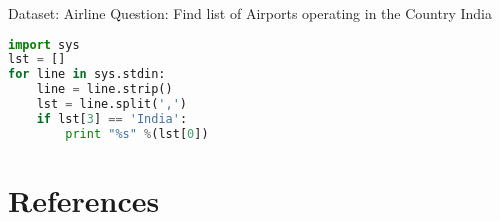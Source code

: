 \documentclass[pdf]{beamer}
\begin{document}
\begin{frame}[fragile]{Dataset: Airline}
Question: Find list of Airports operating in the Country India
\begin{lstlisting}[language=python]
import sys
lst = []
for line in sys.stdin:
    line = line.strip()
    lst = line.split(',')
    if lst[3] == 'India':
        print "%s" %(lst[0]) 
\end{lstlisting}
\end{frame}


\section{References}
 

\end{document}
